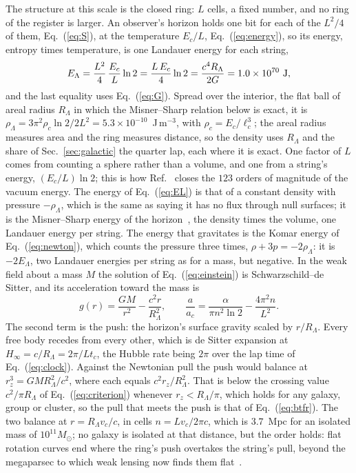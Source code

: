 \documentclass[aps,prd,twocolumn,superscriptaddress,nofootinbib,showkeys]{revtex4-2}
\newcommand{\lc}{\ell_c}
\newcommand{\tc}{t_c}
\newcommand{\Ec}{E_c}
\newcommand{\ac}{a_c}
\newcommand{\RL}{R_\Lambda}
\begin{document}
The structure at this scale is the closed ring: $L$ cells, a fixed number, and no ring of the register is larger. An observer's horizon holds one bit for each of the $L^2/4$ of them, Eq.~(\ref{eq:S}), at the temperature $\Ec/L$, Eq.~(\ref{eq:energy}), so its energy, entropy times temperature, is one Landauer energy for each string,
\begin{equation}
E_\Lambda = \frac{L^2}{4}\,\frac{\Ec}{L}\ln2 = \frac{L\,\Ec}{4}\ln2 = \frac{c^4\RL}{2G} = 1.0\times10^{70}~{\rm J},
\label{eq:EL}
\end{equation}
and the last equality uses Eq.~(\ref{eq:G}). Spread over the interior, the flat ball of areal radius $\RL$ in which the Misner--Sharp relation below is exact, it is $\rho_\Lambda = 3\pi^2\rho_c\ln2/2L^2 = 5.3\times10^{-10}$~J\,m$^{-3}$, with $\rho_c = \Ec/\lc^3$; the areal radius measures area and the ring measures distance, so the density uses $\RL$ and the share of Sec.~\ref{sec:galactic} the quarter lap, each where it is exact. One factor of $L$ comes from counting a sphere rather than a volume, and one from a string's energy, $(\Ec/L)\ln2$; this is how Ref.~\cite{korytko2026b} closes the $123$ orders of magnitude of the vacuum energy. The energy of Eq.~(\ref{eq:EL}) is that of a constant density with pressure $-\rho_\Lambda$, which is the same as saying it has no flux through null surfaces; it is the Misner--Sharp energy of the horizon~\cite{misner1964}, the density times the volume, one Landauer energy per string. The energy that gravitates is the Komar energy of Eq.~(\ref{eq:newton}), which counts the pressure three times, $\rho + 3p = -2\rho_\Lambda$: it is $-2E_\Lambda$, two Landauer energies per string as for a mass, but negative. In the weak field about a mass $M$ the solution of Eq.~(\ref{eq:einstein}) is Schwarzschild--de Sitter, and its acceleration toward the mass is
\begin{equation}
g(r) = \frac{GM}{r^2} - \frac{c^2 r}{\RL^2}, \qquad \frac{a}{\ac} = \frac{\alpha}{\pi n^2\ln2} - \frac{4\pi^2 n}{L^2} .
\label{eq:push}
\end{equation}
The second term is the push: the horizon's surface gravity scaled by $r/\RL$. Every free body recedes from every other, which is de Sitter expansion at $H_\infty = c/\RL = 2\pi/L\tc$, the Hubble rate being $2\pi$ over the lap time of Eq.~(\ref{eq:clock}). Against the Newtonian pull the push would balance at $r_z^3 = GM\RL^2/c^2$, where each equals $c^2r_z/\RL^2$. That is below the crossing value $c^2/\pi\RL$ of Eq.~(\ref{eq:criterion}) whenever $r_z < \RL/\pi$, which holds for any galaxy, group or cluster, so the pull that meets the push is that of Eq.~(\ref{eq:btfr}). The two balance at $r = \RL v_c/c$, in cells $n = Lv_c/2\pi c$, which is $3.7$~Mpc for an isolated mass of $10^{11}M_\odot$; no galaxy is isolated at that distance, but the order holds: flat rotation curves end where the ring's push overtakes the string's pull, beyond the megaparsec to which weak lensing now finds them flat~\cite{mistele2024}.
\end{document}
